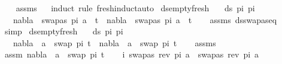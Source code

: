 \begin{isabellebody}
%
\isadelimproof
\ \ %
\endisadelimproof
%
\isatagproof
{}\isamarkupfalse%
\ assms\isanewline
\ \ \isamarkupfalse%
{\isacharparenleft}{\kern0pt}induct\ rule{\isacharcolon}{\kern0pt}\ fresh{\isachardot}{\kern0pt}induct{\isacharparenright}{\kern0pt}{\isacharparenleft}{\kern0pt}auto{\isacharparenright}{\kern0pt}%
\endisatagproof
{\isafoldproof}%
%
\isadelimproof
\isanewline
%
\endisadelimproof
\isanewline
{}\isamarkupfalse%
\ ds{\isacharunderscore}{\kern0pt}empty{\isacharunderscore}{\kern0pt}fresh{\isacharunderscore}{\kern0pt}{}{\isacharcolon}{\kern0pt}\isanewline
\ \ \ {\isachardoublequoteopen}ds\ pi{}\ pi{}\ {\isacharequal}{\kern0pt}\ {\isacharbraceleft}{\kern0pt}{\isacharbraceright}{\kern0pt}{\isachardoublequoteclose}\isanewline
\ \ \ {\isachardoublequoteopen}nabla\ {\isasymturnstile}\ swapas\ pi{}\ a\ {\isasymsharp}\ t\ {\isasymLongrightarrow}\ nabla\ {\isasymturnstile}\ swapas\ pi{}\ a\ {\isasymsharp}\ t{\isachardoublequoteclose}\isanewline
%
\isadelimproof
\ \ %
\endisadelimproof
%
\isatagproof
{}\isamarkupfalse%
\ assms\ ds{\isacharunderscore}{\kern0pt}swapas{\isacharunderscore}{\kern0pt}eq\ \isamarkupfalse%
\ simp%
\endisatagproof
{\isafoldproof}%
%
\isadelimproof
\isanewline
%
\endisadelimproof
\isanewline
{}\isamarkupfalse%
\ ds{\isacharunderscore}{\kern0pt}empty{\isacharunderscore}{\kern0pt}fresh{\isacharunderscore}{\kern0pt}{}{\isacharcolon}{\kern0pt}\isanewline
\ \ \ {\isachardoublequoteopen}ds\ pi{}\ pi{}\ {\isacharequal}{\kern0pt}\ {\isacharbraceleft}{\kern0pt}{\isacharbraceright}{\kern0pt}{\isachardoublequoteclose}\isanewline
\ \ \ {\isachardoublequoteopen}nabla\ {\isasymturnstile}\ a\ {\isasymsharp}\ swap\ pi{}\ t\ {\isasymLongrightarrow}\ nabla\ {\isasymturnstile}\ a\ {\isasymsharp}\ swap\ pi{}\ t{\isachardoublequoteclose}\isanewline
%
\isadelimproof
\ \ %
\endisadelimproof
%
\isatagproof
{}\isamarkupfalse%
\ assms\ \isanewline
{}\isamarkupfalse%
{\isacharminus}{\kern0pt}\isanewline
\ \ \isamarkupfalse%
\ assm{}{\isacharcolon}{\kern0pt}\ {\isachardoublequoteopen}nabla\ {\isasymturnstile}\ a\ {\isasymsharp}\ swap\ pi{}\ t{\isachardoublequoteclose}\isanewline
\ \ \isamarkupfalse%
\ i{\isacharcolon}{\kern0pt}\ {\isachardoublequoteopen}swapas\ {\isacharparenleft}{\kern0pt}rev\ pi{}{\isacharparenright}{\kern0pt}\ a\ {\isacharequal}{\kern0pt}\ swapas\ {\isacharparenleft}{\kern0pt}rev\ pi{}{\isacharparenright}{\kern0pt}\ a{\isachardoublequoteclose}\isanewline

\end{isabellebody}
